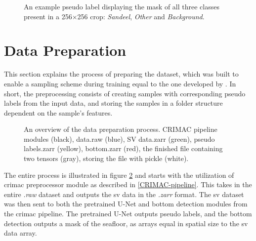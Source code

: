         \begin{figure}[H]
        \centering
        	\label{subfig:correct}
        	
        
        
        
        \caption[Pseudo label]{An example pseudo label displaying the mask of all three classes present in a 256×256 crop: \textit{Sandeel}, \textit{Other} and \textit{Background}.} %
        \label{data sample fig}
        
        \end{figure}


        
    \section{Data Preparation}
        This section explains the process of preparing the dataset, which was built to enable a sampling scheme during training equal to the one developed by \citeauthor{brautaset2020acoustic}\cite{brautaset2020acoustic}. In short, the preprocessing consists of creating samples with corresponding pseudo labels from the input data, and storing the samples in a folder structure dependent on the sample's features.
        
        \clearpage
        \begin{figure}[H]
            \centering
            
            \caption[Data preparation process]{An overview of the data preparation process. CRIMAC pipeline modules (black), data.raw (blue), SV data.zarr (green), pseudo labels.zarr (yellow), bottom.zarr (red), the finished file containing two tensors (gray), storing the file with pickle (white).}
          	\medskip 
            \label{data_generation_flowchart_fig}
        \end{figure}
        
        The entire process is illustrated in figure \ref{data_generation_flowchart_fig} and starts with the utilization of \gls{crimac} preprocessor module as described in \ref{CRIMAC-pipeline}. This takes in the entire \textit{.raw} dataset and outputs the \gls{sv} data in the \textit{.zarr} format. The \gls{sv} dataset was then sent to both the pretrained U-Net and bottom detection modules from the \gls{crimac} pipeline. The pretrained U-Net outputs pseudo labels, and the bottom detection outputs a mask of the seafloor, as arrays equal in spatial size to the \gls{sv} data array.
        

